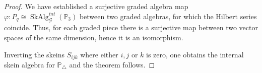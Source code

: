 \documentclass[a4paper]{article}
\numberwithin{equation}{section}
\newcommand{\1}{{\mathrm{1}\mkern-4mu{\mathchoice{}{}{\mskip-0.5mu}{\mskip-1mu}}\mathrm{l}}}
\newcommand{\PP}{\mathbb{P}}
\DeclareMathOperator{\SkAlg}{SkAlg}
\begin{document}
\begin{proof}
We have established a surjective graded algebra map $\varphi: P_q \cong \SkAlg^{int}_\mathcal{G}(\PP_3)$ between two graded algebras, for which the Hilbert series coincide. Thus, for each graded piece there is a surjective map between two vector spaces of the same dimension, hence it is an isomorphism.

Inverting the skeins $S_{ijk}$ where either $i,j$ or $k$ is zero, one obtains the internal skein algebra for $\PP_\triangle$ and the theorem follows.
\end{proof}


\end{document}
